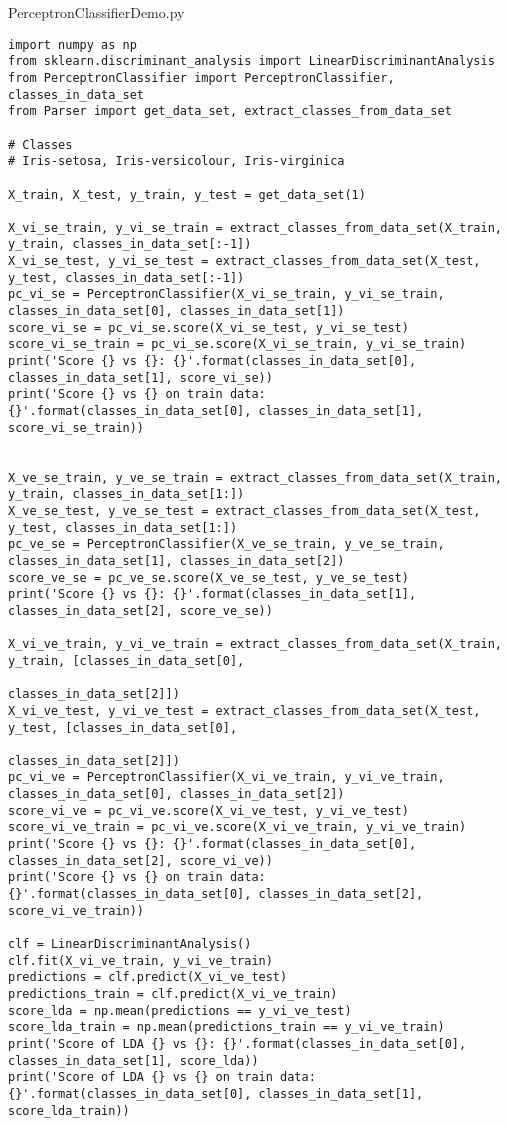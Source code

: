 PerceptronClassifierDemo.py
\begin{lstlisting}[style=py]
import numpy as np
from sklearn.discriminant_analysis import LinearDiscriminantAnalysis
from PerceptronClassifier import PerceptronClassifier, classes_in_data_set
from Parser import get_data_set, extract_classes_from_data_set

# Classes
# Iris-setosa, Iris-versicolour, Iris-virginica

X_train, X_test, y_train, y_test = get_data_set(1)

X_vi_se_train, y_vi_se_train = extract_classes_from_data_set(X_train, y_train, classes_in_data_set[:-1])
X_vi_se_test, y_vi_se_test = extract_classes_from_data_set(X_test, y_test, classes_in_data_set[:-1])
pc_vi_se = PerceptronClassifier(X_vi_se_train, y_vi_se_train, classes_in_data_set[0], classes_in_data_set[1])
score_vi_se = pc_vi_se.score(X_vi_se_test, y_vi_se_test)
score_vi_se_train = pc_vi_se.score(X_vi_se_train, y_vi_se_train)
print('Score {} vs {}: {}'.format(classes_in_data_set[0], classes_in_data_set[1], score_vi_se))
print('Score {} vs {} on train data: {}'.format(classes_in_data_set[0], classes_in_data_set[1], score_vi_se_train))


X_ve_se_train, y_ve_se_train = extract_classes_from_data_set(X_train, y_train, classes_in_data_set[1:])
X_ve_se_test, y_ve_se_test = extract_classes_from_data_set(X_test, y_test, classes_in_data_set[1:])
pc_ve_se = PerceptronClassifier(X_ve_se_train, y_ve_se_train, classes_in_data_set[1], classes_in_data_set[2])
score_ve_se = pc_ve_se.score(X_ve_se_test, y_ve_se_test)
print('Score {} vs {}: {}'.format(classes_in_data_set[1], classes_in_data_set[2], score_ve_se))

X_vi_ve_train, y_vi_ve_train = extract_classes_from_data_set(X_train, y_train, [classes_in_data_set[0],
                                                             classes_in_data_set[2]])
X_vi_ve_test, y_vi_ve_test = extract_classes_from_data_set(X_test, y_test, [classes_in_data_set[0],
                                                                            classes_in_data_set[2]])
pc_vi_ve = PerceptronClassifier(X_vi_ve_train, y_vi_ve_train, classes_in_data_set[0], classes_in_data_set[2])
score_vi_ve = pc_vi_ve.score(X_vi_ve_test, y_vi_ve_test)
score_vi_ve_train = pc_vi_ve.score(X_vi_ve_train, y_vi_ve_train)
print('Score {} vs {}: {}'.format(classes_in_data_set[0], classes_in_data_set[2], score_vi_ve))
print('Score {} vs {} on train data: {}'.format(classes_in_data_set[0], classes_in_data_set[2], score_vi_ve_train))

clf = LinearDiscriminantAnalysis()
clf.fit(X_vi_ve_train, y_vi_ve_train)
predictions = clf.predict(X_vi_ve_test)
predictions_train = clf.predict(X_vi_ve_train)
score_lda = np.mean(predictions == y_vi_ve_test)
score_lda_train = np.mean(predictions_train == y_vi_ve_train)
print('Score of LDA {} vs {}: {}'.format(classes_in_data_set[0], classes_in_data_set[1], score_lda))
print('Score of LDA {} vs {} on train data: {}'.format(classes_in_data_set[0], classes_in_data_set[1], score_lda_train))

\end{lstlisting}




